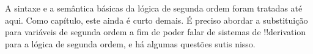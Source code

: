\documentclass[../../../include/open-logic-chapter]{subfiles}
\begin{document}

\begin{editorial}
A sintaxe e a semântica básicas da lógica de segunda ordem foram tratadas
até aqui. Como capítulo, este ainda é curto demais. É preciso abordar a
substituição para variáveis de segunda ordem a fim de poder falar de
sistemas de !!{derivation} para a lógica de segunda ordem, e há algumas
questões sutis nisso.
\end{editorial}







\OLEndChapterHook
\end{document}
